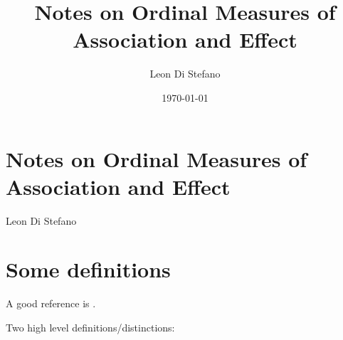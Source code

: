 \documentclass[
  11pt,
  fleqn
]{article}
\title{Notes on Ordinal Measures of Association and Effect}
\author{Leon Di Stefano}
\date{\today}
\begin{document}
\section*{Notes on Ordinal Measures of Association and Effect}
Leon Di Stefano

\section{Some definitions}

A good reference is \citet{kruskalOrdinalMeasuresAssociation1958}.

Two high level definitions/distinctions:
\end{document}
